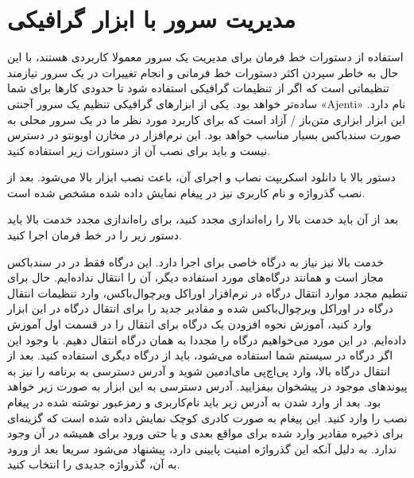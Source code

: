\section{مدیریت سرور با ابزار گرافیکی}
استفاده از دستورات خط فرمان برای مدیریت یک سرور معمولا کاربردی هستند، با این حال به خاطر سپردن اکثر دستورات خط فرمانی و انجام تغییرات در یک سرور نیازمند تنظیماتی است که اگر از تنظیمات گرافیکی استفاده شود تا حدودی کارها برای شما ساده‌تر خواهد بود. یکی از ابزارهای گرافیکی تنظیم یک سرور آجنتی «Ajenti» نام دارد. این ابزار ابزاری متن‌باز / آزاد است که برای کاربرد مورد نظر ما در یک سرور محلی به صورت سندباکس بسیار مناسب خواهد بود. این نرم‌افزار در مخازن اوبونتو در دسترس نیست و باید برای نصب آن از دستورات زیر استفاده کنید.
\newline

\begin{latin}  
    
\end{latin}
دستور بالا با دانلود اسکریپت نصاب و اجرای آن، باعث نصب ابزار بالا می‌شود. بعد از نصب گذرواژه و نام کاربری نیز  در پیغام نمایش داده شده مشخص شده است.
\newline

\begin{latin}  
    
\end{latin}

بعد از آن باید خدمت بالا را راه‌اندازی مجدد کنید، برای راه‌اندازی مجدد خدمت بالا باید دستور زیر را در خط فرمان اجرا کنید.
\newline

\begin{latin}  
    
\end{latin}

خدمت بالا نیز نیاز به درگاه خاصی برای اجرا دارد. این درگاه فقط در در سندباکس مجاز است و همانند درگاه‌های مورد استفاده دیگر، آن را انتقال نداده‌ایم.  حال برای تنطیم مجدد موارد انتقال درگاه در نرم‌افزار اوراکل ویرچوال‌باکس، وارد تنظیمات انتقال درگاه در اوراکل ویرچوال‌باکس شده و مقادیر جدید را برای انتقال درگاه در این ابزار وارد کنید، آموزش نحوه افزودن یک درگاه برای انتقال را در قسمت اول آموزش داده‌ایم. در این مورد می‌خواهیم درگاه  را مجددا به همان درگاه  انتقال دهیم. با وجود این اگر درگاه  در سیستم شما استفاده می‌شود، باید از درگاه دیگری استفاده کنید.  بعد از انتقال درگاه بالا، وارد پی‌اچ‌پی مای‌ادمین شوید و آدرس دسترسی به برنامه را نیز به پیوندهای موجود در پیشخوان بیفزایید. آدرس دسترسی به این ابزار به صورت زیر خواهد بود. بعد از وارد شدن به آدرس زیر باید نام‌کاربری و رمز‌عبور نوشته شده در پیغام نصب را وارد کنید. این پیغام به صورت کادری کوچک نمایش داده شده است که گزینه‌ای برای ذخیره مقادیر وارد شده برای مواقع بعدی و یا حتی ورود برای همیشه در آن وجود ندارد. به دلیل آنکه این گذرواژه امنیت پایینی دارد، پیشنهاد می‌شود سریعا بعد از ورود به آن، گذرواژه جدیدی را انتخاب کنید.

